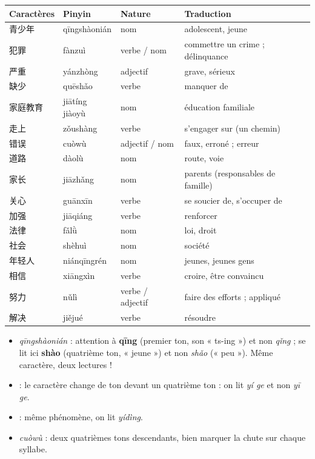 \documentclass[11pt]{article}
\newcommand{\zh}[1]{\ifmmode\text{#1}\else{#1}\fi}
\begin{document}
\begin{definition}
\begin{center}
\begin{tabularx}{\linewidth}{|X|X|X|X|}
\hline
\rowcolor{popblueL} Caractères & Pinyin & Nature & Traduction \\
\hline
青少年 & qīngshàonián & nom & adolescent, jeune \\
\hline
犯罪 & fànzuì & verbe / nom & commettre un crime ; délinquance \\
\hline
严重 & yánzhòng & adjectif & grave, sérieux \\
\hline
缺少 & quēshǎo & verbe & manquer de \\
\hline
家庭教育 & jiātíng jiàoyù & nom & éducation familiale \\
\hline
走上 & zǒushàng & verbe & s'engager sur (un chemin) \\
\hline
错误 & cuòwù & adjectif / nom & faux, erroné ; erreur \\
\hline
道路 & dàolù & nom & route, voie \\
\hline
家长 & jiāzhǎng & nom & parents (responsables de famille) \\
\hline
关心 & guānxīn & verbe & se soucier de, s'occuper de \\
\hline
加强 & jiāqiáng & verbe & renforcer \\
\hline
法律 & fǎlǜ & nom & loi, droit \\
\hline
社会 & shèhuì & nom & société \\
\hline
年轻人 & niánqīngrén & nom & jeunes, jeunes gens \\
\hline
相信 & xiāngxìn & verbe & croire, être convaincu \\
\hline
努力 & nǔlì & verbe / adjectif & faire des efforts ; appliqué \\
\hline
解决 & jiějué & verbe & résoudre \\
\hline
\end{tabularx}
\end{center}
\end{definition}

\begin{attention}
\begin{itemize}
\item \zh{青少年} \emph{qīngshàonián} : attention à \textbf{qīng} (premier ton, son « ts-ing ») et non \emph{qǐng} ; \zh{少} se lit ici \textbf{shào} (quatrième ton, « jeune ») et non \emph{shǎo} (« peu »). Même caractère, deux lectures !
\item \zh{一个} : le caractère \zh{一} change de ton devant un quatrième ton : on lit \emph{yí ge} et non \emph{yī ge}.
\item \zh{一定} : même phénomène, on lit \emph{yídìng}.
\item \zh{错误} \emph{cuòwù} : deux quatrièmes tons descendants, bien marquer la chute sur chaque syllabe.
\end{itemize}
\end{attention}
\end{document}
